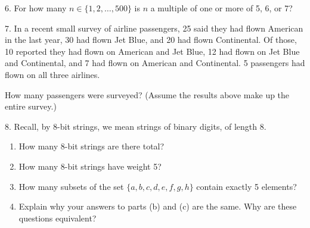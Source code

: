 \documentclass[10pt,]{book}
\theoremstyle{plain}
\theoremstyle{definition}
\theoremstyle{definition}
\theoremstyle{definition}
\numberwithin{equation}{section}
\begin{document}
\begin{exerciselist}
\par\smallskip
\item[6.]\hypertarget{exercise-107}{}
            For how many \(n \in \{1,2, \ldots, 500\}\) is \(n\) a multiple of one or more of 5, 6, or 7?
\par\smallskip
\item[7.]\hypertarget{exercise-108}{}
            In a recent small survey of airline passengers, 25 said they had flown American in the last year, 30 had flown Jet Blue, and 20 had flown Continental. Of those, 10 reported they had flown on American and Jet Blue, 12 had flown on Jet Blue and Continental, and 7 had flown on American and Continental. 5 passengers had flown on all three airlines.
\par

            How many passengers were surveyed? (Assume the results above make up the entire survey.)
\par\smallskip
\item[8.]\hypertarget{exercise-109}{}
            Recall, by \(8\)-bit strings, we mean strings of binary digits, of length 8.
            \leavevmode%
\begin{enumerate}[label=(\alph*)]
\item\hypertarget{li-733}{}
                How many \(8\)-bit strings are there total?
\item\hypertarget{li-734}{}
                How many \(8\)-bit strings have weight 5?
\item\hypertarget{li-735}{}
                How many subsets of the set \(\{a,b,c,d,e,f,g,h\}\) contain exactly 5 elements?
\item\hypertarget{li-736}{}
                Explain why your answers to parts (b) and (c) are the same. Why are these questions equivalent?
\end{enumerate}


\end{exerciselist}
\end{document}
